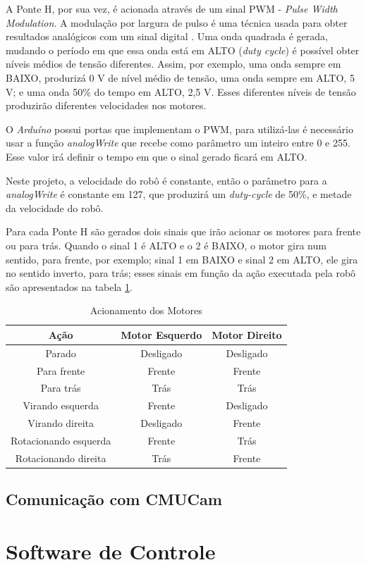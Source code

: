 A Ponte H, por sua vez, é acionada através de um sinal PWM - \textit{Pulse Width Modulation}. A modulação por largura de pulso é uma técnica usada para obter resultados analógicos com um sinal digital \cite{arduino3}. Uma onda quadrada é gerada, mudando o período em que essa onda está em ALTO (\textit{duty cycle}) é possível obter níveis médios de tensão diferentes. Assim, por exemplo, uma onda sempre em BAIXO, produrizá 0 V de nível médio de tensão, uma onda sempre em ALTO, 5 V; e uma onda 50\% do tempo em ALTO, 2,5 V. Esses diferentes níveis de tensão produzirão diferentes velocidades nos motores.

O \textit{Arduíno} possui portas que implementam o PWM, para utilizá-las é necessário usar a função \textit{analogWrite} que recebe como parâmetro um inteiro entre 0 e 255. Esse valor irá definir o tempo em que o sinal gerado ficará em ALTO.

Neste projeto, a velocidade do robô é constante, então o parâmetro para a \textit{analogWrite} é constante em 127, que produzirá um \textit{duty-cycle} de 50\%, e metade da velocidade do robô.

Para cada Ponte H são gerados dois sinais que irão acionar os motores para frente ou para trás. Quando o sinal 1 é ALTO e o 2 é BAIXO, o motor gira num sentido, para frente, por exemplo; sinal 1 em BAIXO e sinal 2 em ALTO, ele gira no sentido inverto, para trás; esses sinais em função da ação executada pela robô são apresentados na tabela \ref{int_tbl03}.

\begin{table}[h!]
    \centering
    \begin{tabular}{|c|c|c|} \hline
        \textbf{Ação} & \textbf{Motor Esquerdo} & \textbf{Motor Direito} \\ \hline
        Parado & Desligado & Desligado \\ \hline
        Para frente & Frente & Frente \\ \hline
        Para trás & Trás & Trás \\ \hline
        Virando esquerda & Frente & Desligado \\ \hline
        Virando direita & Desligado & Frente \\ \hline
        Rotacionando esquerda & Frente & Trás \\ \hline
        Rotacionando direita & Trás & Frente \\ \hline
    \end{tabular}
    \caption{Acionamento dos Motores}
    \label{int_tbl03}
\end{table}

\subsection{Comunicação com CMUCam}

\section{Software de Controle}
\label{sec_soft_controle}
